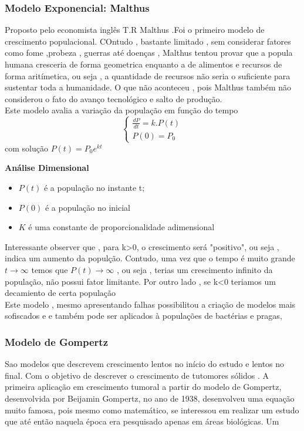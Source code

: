 \subsubsection*{ Modelo Exponencial: Malthus}
Proposto pelo economista inglês T.R Malthus .Foi o primeiro modelo de crescimento populacional. COntudo , bastante limitado , sem considerar fatores como fome ,probeza , guerras até doenças , Malthus tentou provar que a popula humana cresceria de forma geometrica enquanto a de alimentos e recursos de forma aritímetica, ou seja , a quantidade de recursos não seria o suficiente para sustentar toda a humanidade. O que não  aconteceu , pois Malthus também não considerou o fato do avanço tecnológico  e salto de produção.\\
Este modelo avalia a variação da população em função do tempo 
     \begin{equation}
\begin{cases}
  \frac{dP}{dt} =k.P(t)\\
   P(0)=P_0  
\end{cases}
\end{equation}
com solução $P(t)=P_0e^{kt}$

\textbf{Análise Dimensional}

\begin{itemize}
    \item $P(t)$ é a população no instante t;
    \item $P(0)$ é a população no inicial
    \item $K$ é uma constante de proporcionalidade adimensional 
\end{itemize}

Interessante observer que , para k>0, o crescimento será "positivo", ou seja , indica um aumento da populção. Contudo, uma vez que o tempo é muito grande $t \to\infty $ temos que $P(t) \to \infty$ , ou seja , terias um crescimento infinito da população, não possui fator limitante. Por outro lado , se k<0 teriamos um decamiento de certa população 
\\
 Este modelo , mesmo apresentando falhas possibilitou a criação de modelos mais sofiscados e e também pode ser aplicados à populações de bactérias e pragas, 

\newpage
\subsubsection*{ Modelo de Gompertz}

Sao modelos que descrevem crescimento lentos no início do estudo e lentos no final. Com o objetivo de descrever o crescimento de tutomores sólidos . A primeira aplicação em crescimento tumoral a partir do modelo de Gompertz, desenvolvida por Beijamin Gompertz, no ano de 1938, desenvolveu uma equação muito famosa, pois mesmo como matemático, se interessou em realizar um estudo que até então naquela época era pesquisado apenas em áreas biológicas. Um 

